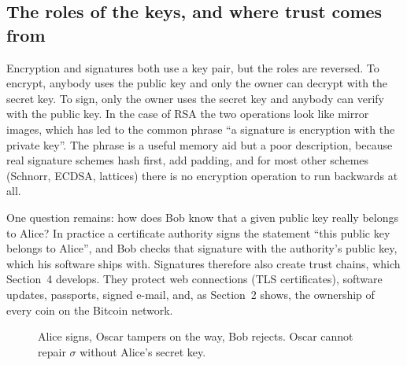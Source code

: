 \documentclass[11pt,a4paper]{article}
\theoremstyle{definition}
\newcommand{\Sign}{\mathsf{Sign}}
\newcommand{\Ver}{\mathsf{Ver}}
\newcommand{\sk}{\mathit{sk}}
\newcommand{\pk}{\mathit{pk}}
\begin{document}
\subsection{The roles of the keys, and where trust comes from}

Encryption and signatures both use a key pair, but the roles are reversed. To encrypt, anybody uses the public key and only the owner can decrypt with the secret key. To sign, only the owner uses the secret key and anybody can verify with the public key. In the case of RSA the two operations look like mirror images, which has led to the common phrase ``a signature is encryption with the private key''. The phrase is a useful memory aid but a poor description, because real signature schemes hash first, add padding, and for most other schemes (Schnorr, ECDSA, lattices) there is no encryption operation to run backwards at all.

One question remains: how does Bob know that a given public key really belongs to Alice? In practice a certificate authority signs the statement ``this public key belongs to Alice'', and Bob checks that signature with the authority's public key, which his software ships with. Signatures therefore also create trust chains, which Section~4 develops. They protect web connections (TLS certificates), software updates, passports, signed e-mail, and, as Section~2 shows, the ownership of every coin on the Bitcoin network.

\begin{figure}[h]
\centering
{}
\caption{Alice signs, Oscar tampers on the way, Bob rejects. Oscar cannot repair $\sigma$ without Alice's secret key.}
\end{figure}
\end{document}
